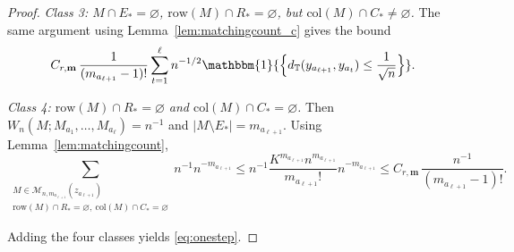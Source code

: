 \documentclass[11pt]{article}
\newcommand{\cM}{\mathcal{M}}
\newcommand{\abs}[1]{| #1|}
\newcommand{\bone}{\mathbbm{1}}
\begin{document}
\begin{proof}
\smallskip
\noindent
\emph{Class 3: $M\cap E_*=\varnothing$, $\mathrm{row}(M)\cap R_*=\varnothing$, but
$\mathrm{col}(M)\cap C_*\neq\varnothing$.}
The same argument using Lemma~\ref{lem:matchingcount_c} gives the bound
\[
C_{r,\mathbf m}\,\frac{1}{(m_{a_{\ell+1}}-1)!}
\sum_{t=1}^{\ell} n^{-1/2}\bone{\Bigl\{d_{\mathbb{T}}(y_{a_{\ell + 1}}, y_{a_t}) \leq \frac{1}{\sqrt{n}}\Bigr\}}.
\]

\smallskip
\noindent
\emph{Class 4: $\mathrm{row}(M)\cap R_*=\varnothing$ and
$\mathrm{col}(M)\cap C_*=\varnothing$.}
Then $W_n(M;M_{a_1},\dots,M_{a_\ell})=n^{-1}$ and
$\abs{M\setminus E_*} = m_{a_{\ell+1}}$.
Using Lemma~\ref{lem:matchingcount},
\[
\sum_{\substack{M\in \cM_{n,m_{a_{\ell+1}}}(z_{a_{\ell+1}})\\
\mathrm{row}(M)\cap R_*=\varnothing,\ \mathrm{col}(M)\cap C_*=\varnothing}}
n^{-1}n^{-m_{a_{\ell+1}}}
\le
n^{-1}\frac{K^{m_{a_{\ell+1}}}n^{m_{a_{\ell+1}}}}{m_{a_{\ell+1}}!}n^{-m_{a_{\ell+1}}}
\le
C_{r,\mathbf m}\,\frac{n^{-1}}{(m_{a_{\ell+1}}-1)!}.
\]

Adding the four classes yields \eqref{eq:onestep}.
\end{proof}
\end{document}
